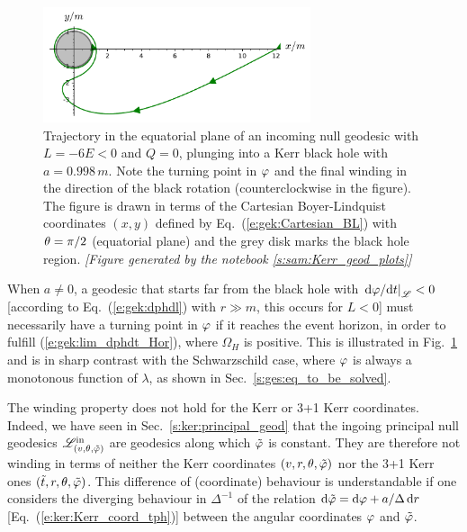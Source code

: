 \begin{figure}
\centerline{\includegraphics[width=0.7\textwidth]{gek_winding_null.pdf}}
\caption[]{\label{f:gek:winding_null} \footnotesize
Trajectory in the equatorial plane of an incoming null geodesic with
$L=-6E < 0$ and $Q=0$, plunging into a Kerr black hole with $a = 0.998 \, m$.
Note the turning point in $\varphi$ and the final winding in the direction of the black
rotation (counterclockwise in the figure). The figure is drawn in terms
of the Cartesian Boyer-Lindquist coordinates $(x,y)$ defined by
Eq.~(\ref{e:gek:Cartesian_BL}) with $\theta=\pi/2$ (equatorial plane)
and the grey disk marks the black hole region.
\textsl{[Figure generated by the notebook \ref{s:sam:Kerr_geod_plots}]}
}
\end{figure}


\begin{remark}
When $a\not=0$,
a geodesic that starts far from the black hole with
$\left. \mathrm{d}\varphi/\mathrm{d} t \right| _{\mathscr{L}} < 0$ [according to Eq.~(\ref{e:gek:dphdl}) with $r\gg m$,
this occurs for $L <0$]
must necessarily have a turning point in $\varphi$
if it reaches the event horizon, in order to fulfill (\ref{e:gek:lim_dphdt_Hor}),
where $\Omega_H$ is positive. This is illustrated in Fig.~\ref{f:gek:winding_null}
and is in sharp contrast with the Schwarzschild case, where $\varphi$ is always
a monotonous function of $\lambda$, as shown in Sec.~\ref{s:ges:eq_to_be_solved}.
\end{remark}


\begin{remark}
The winding property does not hold for the Kerr or 3+1 Kerr coordinates. Indeed,
we have seen in Sec.~\ref{s:ker:principal_geod} that the
ingoing principal null geodesics $\mathscr{L}^{\rm in}_{(v,\theta,{\tilde\varphi})}$ are geodesics
along which ${\tilde\varphi}$ is constant. They are therefore not winding in terms
of neither the Kerr coordinates $(v,r,\theta,{\tilde\varphi})$ nor the 3+1 Kerr ones $({\tilde t},r,\theta,{\tilde\varphi})$.
This difference of (coordinate) behaviour is understandable if one considers
the diverging behaviour in $\Delta^{-1}$ of the
relation $\mathrm{d} {\tilde\varphi} = \mathrm{d} \varphi + a/\Delta\, \mathrm{d} r$ [Eq.~(\ref{e:ker:Kerr_coord_tph})]
between the angular coordinates $\varphi$ and ${\tilde\varphi}$.
\end{remark}

